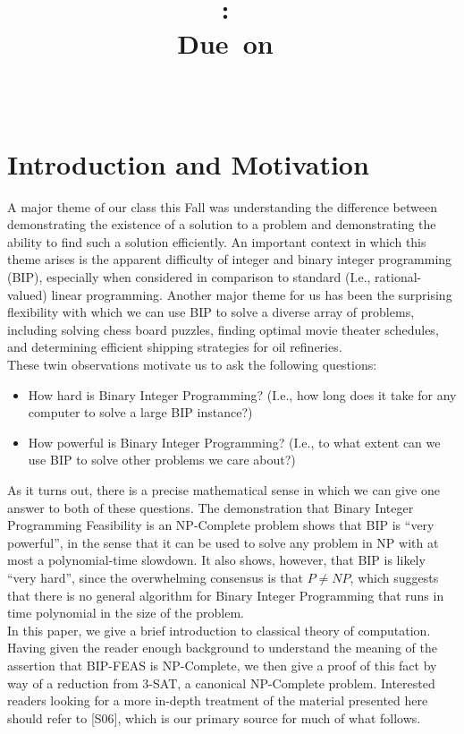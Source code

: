 \documentclass{article}
\title{\vspace{2in}\textmd{\textbf{\hmwkClass:\ \hmwkTitle\ifthenelse{\equal{\hmwkSubTitle}{}}{}{\\\hmwkSubTitle}}}\\\normalsize\vspace{0.1in}\small{Due\ on\ \hmwkDueDate}\\\vspace{0.1in}\large{\textit{\hmwkClassInstructor\ \hmwkClassTime}}\vspace{3in}}
\date{}
\author{\textbf{\hmwkAuthorName}}
\renewcommand{\cite}[1]{[#1]}
\renewcommand{\cite}[1]{[#1]}
\begin{document}
\large

\newpage

\section{Introduction and Motivation}

A major theme of our class this Fall was understanding the difference
between demonstrating the existence of a solution to a problem and
demonstrating the ability to find such a solution efficiently.  An
important context in which this theme arises is the apparent
difficulty of integer and binary integer programming (BIP), especially
when considered in comparison to standard (I.e., rational-valued) linear
programming.  Another major theme for us has been the surprising
flexibility with which we can use BIP to solve a diverse array of
problems, including solving chess board puzzles, finding optimal movie
theater schedules, and determining efficient shipping strategies for
oil refineries. \\

These twin observations motivate us to ask the following questions:

\begin{itemize}
\item How hard is Binary Integer Programming? (I.e., how long does it
  take for any computer to solve a large BIP instance?)
\item How powerful is Binary Integer Programming? (I.e., to what extent
  can we use BIP to solve other problems we care about?)
\end{itemize}

As it turns out, there is a precise mathematical sense in which we can
give one answer to both of these questions.  The demonstration that
Binary Integer Programming Feasibility is an NP-Complete problem shows
that BIP is ``very powerful'', in the sense that it can be used to
solve any problem in NP with at most a polynomial-time slowdown. It
also shows, however, that BIP is likely ``very hard'', since the
overwhelming consensus is that $P \neq NP$, which suggests that there
is no general algorithm for Binary Integer
Programming that runs in time polynomial in the size of the problem. \\

In this paper, we give a brief introduction to classical theory of
computation.  Having given the reader enough background to understand
the meaning of the assertion that BIP-FEAS is NP-Complete, we then
give a proof of this fact by way of a reduction from 3-SAT, a
canonical NP-Complete problem.  Interested readers looking for a more
in-depth treatment of the material presented here should refer to
\cite{S06}, which is our primary source for much of what follows.
\end{document}

